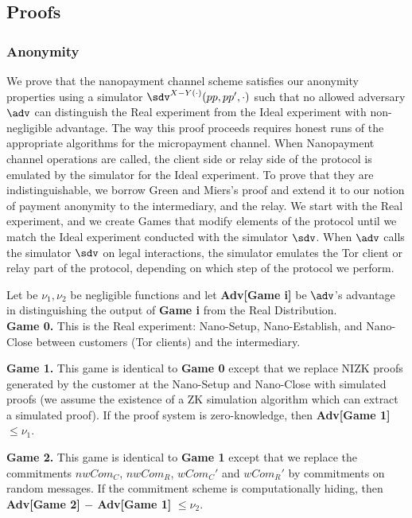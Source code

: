 \subsection{Proofs}

\subsubsection{Anonymity}

\sloppy We prove that the nanopayment channel scheme satisfies our anonymity properties using a simulator $\sdv^{X-Y(\cdot)}(pp,pp',\cdot)$ such that no allowed adversary $\adv$ can distinguish the Real experiment from the Ideal experiment with non-negligible advantage.
The way this proof proceeds requires honest runs of the appropriate algorithms for the micropayment channel.
When Nanopayment channel operations are called, the client side or relay side of the protocol is emulated by the simulator for the Ideal experiment.
To prove that they are indistinguishable, we borrow Green and Miers's proof and extend it to our notion of payment anonymity to the intermediary, and the relay.
We start with the Real experiment, and we create Games that modify elements of the protocol until we match the Ideal experiment conducted with the simulator $\sdv$.
When $\adv$ calls the simulator $\sdv$ on legal interactions, the simulator emulates the Tor client or relay part of the protocol, depending on which step of the protocol we perform.

Let be $\nu_1, \nu_2$ be negligible functions and let \textbf{Adv[Game i]} be $\adv$'s advantage in distinguishing the output of \textbf{Game i} from the Real Distribution.
\\

\textbf{Game 0.}
This is the Real experiment: Nano-Setup, Nano-Establish, and Nano-Close between customers (Tor clients) and the intermediary.

\textbf{Game 1.}
This game is identical to \textbf{Game 0} except that we replace NIZK proofs generated by the customer at the Nano-Setup and Nano-Close with simulated proofs (we assume the existence of a ZK simulation algorithm which can extract a simulated proof).
If the proof system is zero-knowledge, then \textbf{Adv[Game 1] $\leq \nu_1$}.

\textbf{Game 2.} This game is identical to \textbf{Game 1} except that we replace the commitments $nwCom_C$, $nwCom_R$, $wCom_C'$ and $wCom_R'$ by commitments on random messages. If the commitment scheme is computationally hiding, then \textbf{Adv[Game 2] $-$ Adv[Game 1]} $\leq \nu_2$.

